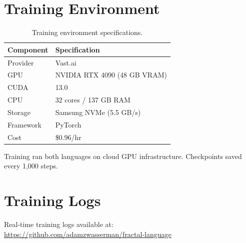 \documentclass[11pt,a4paper]{article}
\begin{document}
\section{Training Environment}

\begin{table}[h]
\centering
\begin{tabular}{ll}
\toprule
Component & Specification \\
\midrule
Provider & Vast.ai \\
GPU & NVIDIA RTX 4090 (48 GB VRAM) \\
CUDA & 13.0 \\
CPU & 32 cores / 137 GB RAM \\
Storage & Samsung NVMe (5.5 GB/s) \\
Framework & PyTorch \\
Cost & \$0.96/hr \\
\bottomrule
\end{tabular}
\caption{Training environment specifications.}
\label{tab:environment}
\end{table}

Training ran both languages on cloud GPU infrastructure. Checkpoints saved every 1,000 steps.

\section{Training Logs}

Real-time training logs available at: \url{https://github.com/adamzwasserman/fractal-language}
\end{document}
